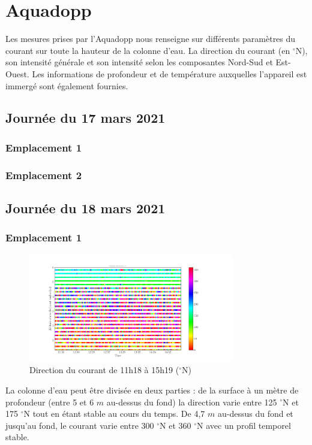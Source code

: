 \documentclass[12pt]{article}
\begin{document}
\section{Aquadopp}
Les mesures prises par l'Aquadopp nous renseigne sur différents paramètres du courant sur toute la hauteur de la colonne d'eau. La direction du courant (en $^{\circ}$N), son intensité générale et son intensité selon les composantes Nord-Sud et Est-Ouest. Les informations de profondeur et de température auxquelles l'appareil est immergé sont également fournies.

\subsection{Journée du 17 mars 2021}
\subsubsection{Emplacement 1}
\subsubsection{Emplacement 2}
\subsection{Journée du 18 mars 2021}
\subsubsection{Emplacement 1}

\begin{figure}[!h]
	\begin{center}
	\includegraphics[width=0.8\textwidth]{180321021scatterdirection.png}
	\caption{Direction du courant de 11h18 à 15h19 ($^{\circ}$N)}
	\end{center}
\end{figure}
La colonne d'eau peut être divisée en deux parties : de la surface à un mètre de profondeur (entre 5 et 6 $m$ au-dessus du fond) la direction varie entre 125 $^{\circ}$N et 175 $^{\circ}$N tout en étant stable au cours du temps.
De 4,7 $m$ au-dessus du fond et jusqu'au fond, le courant varie entre 300 $^{\circ}$N et 360 $^{\circ}$N avec un profil temporel stable.\\
\end{document}
